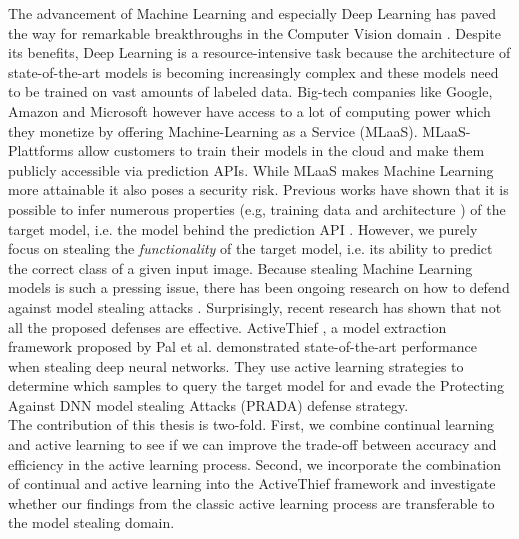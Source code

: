 
\Abstract
The advancement of Machine Learning and especially Deep Learning has paved the way for remarkable breakthroughs in the Computer Vision domain \cite{he2016deep}
 \cite{goodfellow2020generative} \cite{lecun1989backpropagation}. Despite its benefits, Deep Learning is a resource-intensive task because the architecture
  of state-of-the-art models is becoming increasingly complex and these models need to be trained on vast amounts of labeled data. Big-tech companies like Google,
 Amazon and Microsoft however have access to a lot of computing power which they monetize by offering Machine-Learning as a Service (MLaaS). MLaaS-Plattforms
allow customers to train their models in the cloud and make them publicly accessible via prediction APIs. While MLaaS makes Machine Learning more attainable
 it also poses a security risk. Previous works have shown that it is possible to infer numerous properties (e.g, training data \cite{shokri2017membership}
and architecture \cite{oh2019towards}) of the target model, i.e. the model behind the prediction API \cite{tramer2016stealing} \cite{papernot2017practical}.
However, we purely focus on stealing the \textit{functionality} of the target model, i.e. its ability to predict the correct class of a given input image.
Because stealing Machine Learning models is such a pressing issue, there has been ongoing research on how to defend against model stealing attacks
\cite{orekondy2019prediction} \cite{juuti2019prada}. Surprisingly, recent research has shown that not all the proposed defenses are effective.
ActiveThief \cite{pal2020activethief}, a model extraction framework proposed by Pal et al. demonstrated state-of-the-art performance when stealing deep neural
networks. They use active learning strategies to determine which samples to query the target model for and evade the Protecting Against DNN model stealing Attacks
(PRADA)\cite{juuti2019prada} defense strategy. \\
The contribution of this thesis is two-fold. First, we combine continual learning and active learning to see if we can improve the trade-off between accuracy and 
efficiency in the active learning process. Second, we incorporate the combination of continual and active learning into the ActiveThief framework and investigate
whether our findings from the classic active learning process are transferable to the model stealing domain.
